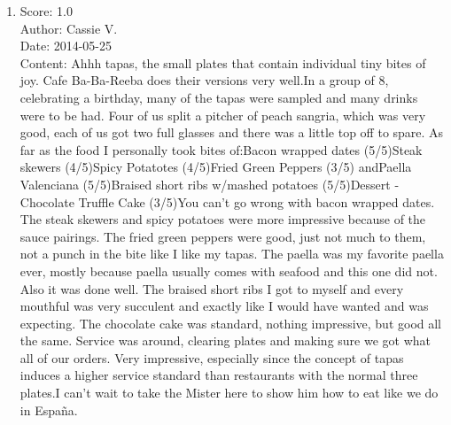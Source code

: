 \documentclass[paper=a4, fontsize=11pt]{jhwhw} %
\begin{document}
\begin{itemize}
\begin{enumerate}
            \item Score: 1.0\\
                Author: Cassie V.\\
                Date: 2014-05-25\\
                Content: Ahhh tapas, the small plates that contain individual tiny bites of joy. Cafe Ba-Ba-Reeba does their versions very well.In a group of 8, celebrating a birthday, many of the tapas were sampled and many drinks were to be had. Four of us split a pitcher of peach sangria, which was very good, each of us got two full glasses and there was a little top off to spare. As far as the food I personally took bites of:Bacon wrapped dates (5/5)Steak skewers (4/5)Spicy Potatotes (4/5)Fried Green Peppers (3/5) andPaella Valenciana (5/5)Braised short ribs w/mashed potatoes (5/5)Dessert - Chocolate Truffle Cake (3/5)You can't go wrong with bacon wrapped dates. The steak skewers and spicy potatoes were more impressive because of the sauce pairings. The fried green peppers were good, just not much to them, not a punch in the bite like I like my tapas. The paella was my favorite paella ever, mostly because paella usually comes with seafood and this one did not. Also it was done well. The braised short ribs I got to myself and every mouthful was very succulent and exactly like I would have wanted and was expecting. The chocolate cake was standard, nothing impressive, but good all the same. Service was around, clearing plates and making sure we got what all of our orders. Very impressive, especially since the concept of tapas induces a higher service standard than restaurants with the normal three plates.I can't wait to take the Mister here to show him how to eat like we do in España. 
        \end{enumerate}


\end{itemize}
\end{document}
